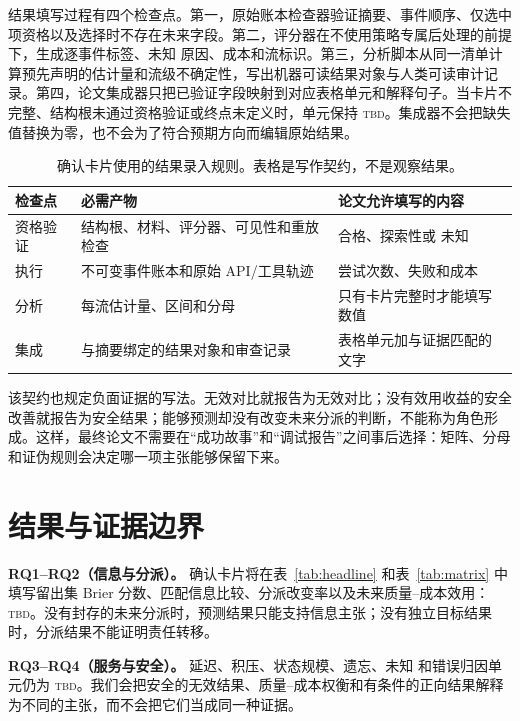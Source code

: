 \documentclass[UTF8,twocolumn]{ctexart}
\newcommand{\unknown}{\textsc{未知}}
\begin{document}
结果填写过程有四个检查点。第一，原始账本检查器验证摘要、事件顺序、仅选中项资格以及选择时不存在未来字段。第二，评分器在不使用策略专属后处理的前提下，生成逐事件标签、\unknown{} 原因、成本和流标识。第三，分析脚本从同一清单计算预先声明的估计量和流级不确定性，写出机器可读结果对象与人类可读审计记录。第四，论文集成器只把已验证字段映射到对应表格单元和解释句子。当卡片不完整、结构根未通过资格验证或终点未定义时，单元保持 \textsc{tbd}。集成器不会把缺失值替换为零，也不会为了符合预期方向而编辑原始结果。

\begin{table}[t]
\centering\scriptsize
\setlength{\tabcolsep}{2.5pt}
\caption{确认卡片使用的结果录入规则。表格是写作契约，不是观察结果。}
\label{tab:result-contract}
\begin{tabular}{p{}p{}p{}}
\toprule
检查点 & 必需产物 & 论文允许填写的内容 \\
\midrule
资格验证 & 结构根、材料、评分器、可见性和重放检查 & 合格、探索性或 \unknown{} \\
执行 & 不可变事件账本和原始 API/工具轨迹 & 尝试次数、失败和成本 \\
分析 & 每流估计量、区间和分母 & 只有卡片完整时才能填写数值 \\
集成 & 与摘要绑定的结果对象和审查记录 & 表格单元加与证据匹配的文字 \\
\bottomrule
\end{tabular}
\end{table}

该契约也规定负面证据的写法。无效对比就报告为无效对比；没有效用收益的安全改善就报告为安全结果；能够预测却没有改变未来分派的判断，不能称为角色形成。这样，最终论文不需要在“成功故事”和“调试报告”之间事后选择：矩阵、分母和证伪规则会决定哪一项主张能够保留下来。

\section{结果与证据边界}
\label{sec:current}

\textbf{RQ1--RQ2（信息与分派）。} 确认卡片将在表~\ref{tab:headline} 和表~\ref{tab:matrix} 中填写留出集 Brier 分数、匹配信息比较、分派改变率以及未来质量--成本效用：\textsc{tbd}。没有封存的未来分派时，预测结果只能支持信息主张；没有独立目标结果时，分派结果不能证明责任转移。

\textbf{RQ3--RQ4（服务与安全）。} 延迟、积压、状态规模、遗忘、\unknown{} 和错误归因单元仍为 \textsc{tbd}。我们会把安全的无效结果、质量--成本权衡和有条件的正向结果解释为不同的主张，而不会把它们当成同一种证据。
\end{document}
